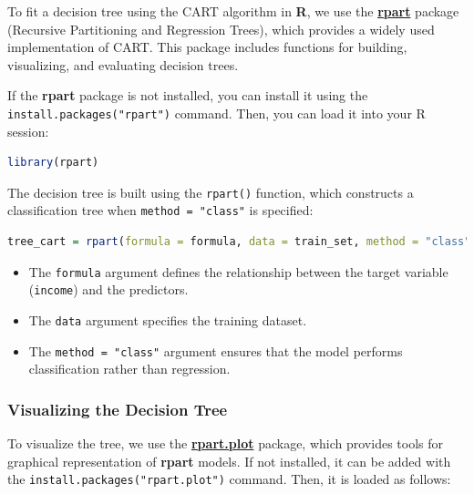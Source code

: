 \documentclass[
]{book}
\newcommand{\passthrough}[1]{#1}
\providecommand{\tightlist}{%
  \setlength{\itemsep}{0pt}\setlength{\parskip}{0pt}}
\theoremstyle{definition}
\theoremstyle{definition}
\theoremstyle{definition}
\theoremstyle{definition}
\theoremstyle{remark}
\begin{document}
To fit a decision tree using the CART algorithm in \textbf{R}, we use the \href{https://CRAN.R-project.org/package=rpart}{\textbf{rpart}} package (Recursive Partitioning and Regression Trees), which provides a widely used implementation of CART. This package includes functions for building, visualizing, and evaluating decision trees.

If the \textbf{rpart} package is not installed, you can install it using the \passthrough{\lstinline!install.packages("rpart")!} command. Then, you can load it into your R session:

\begin{lstlisting}[language=R]
library(rpart)
\end{lstlisting}

The decision tree is built using the \passthrough{\lstinline!rpart()!} function, which constructs a classification tree when \passthrough{\lstinline!method = "class"!} is specified:

\begin{lstlisting}[language=R]
tree_cart = rpart(formula = formula, data = train_set, method = "class")
\end{lstlisting}

\begin{itemize}
\tightlist
\item
  The \passthrough{\lstinline!formula!} argument defines the relationship between the target variable (\passthrough{\lstinline!income!}) and the predictors.
\item
  The \passthrough{\lstinline!data!} argument specifies the training dataset.
\item
  The \passthrough{\lstinline!method = "class"!} argument ensures that the model performs classification rather than regression.
\end{itemize}

\subsubsection*{Visualizing the Decision Tree}\label{visualizing-the-decision-tree}

To visualize the tree, we use the \href{https://CRAN.R-project.org/package=rpart.plot}{\textbf{rpart.plot}} package, which provides tools for graphical representation of \textbf{rpart} models. If not installed, it can be added with the \passthrough{\lstinline!install.packages("rpart.plot")!} command. Then, it is loaded as follows:
\end{document}
